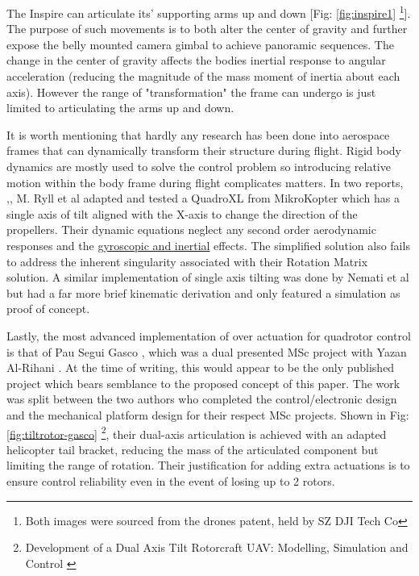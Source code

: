 The Inspire can articulate its' supporting arms up and down [Fig: \ref{fig:inspire1} \footnote{Both images were sourced from the drones patent, held by SZ DJI Tech Co\cite{djinspire}}]. The purpose of such movements is to both alter the center of gravity and further expose the belly mounted camera gimbal to achieve panoramic sequences. The change in the center of gravity affects the bodies inertial response to angular acceleration (reducing the magnitude of the mass moment of inertia about each axis). However the range of "transformation" the frame can undergo is just limited to articulating the arms up and down.
\par
It is worth mentioning that  hardly any research has been done into aerospace frames that can dynamically transform their structure during flight. Rigid body dynamics are mostly used to solve the control problem so introducing relative motion within the body frame during flight complicates matters. In two reports, \cite{tiltpropellercontrol},\cite{tiltpropellerflight}, M. Ryll et al adapted and tested a QuadroXL from MikroKopter \cite{mikrokopter} which has a single axis of tilt aligned with the X-axis to change the direction of the propellers. Their dynamic equations neglect any second order aerodynamic responses and the \underline{gyroscopic and inertial} effects. The simplified solution also fails to address the inherent singularity associated with their Rotation Matrix solution. A similar implementation of single axis tilting was done by Nemati et al \cite{singleaxistilting} but had a far more brief kinematic derivation and only featured a simulation as proof of concept.
\par
Lastly, the most advanced implementation of over actuation for quadrotor control is that of Pau Segui Gasco \cite{tiltgasco}, which was a dual presented MSc project with Yazan Al-Rihani \cite{tiltrihani}. At the time of writing, this would appear to be the only published project which bears semblance to the proposed concept of this paper. The work was split between the two authors who completed the control/electronic design and the mechanical platform design for their respect MSc projects. Shown in Fig:\ref{fig:tiltrotor-gasco} \footnote{Development of a Dual Axis Tilt Rotorcraft UAV: Modelling, Simulation and Control \cite{tiltgasco}}, their dual-axis articulation is achieved with an adapted helicopter tail bracket, reducing the mass of the articulated component but limiting the range of rotation. Their justification for adding extra actuations is to ensure control reliability even in the event of losing up to 2 rotors.
